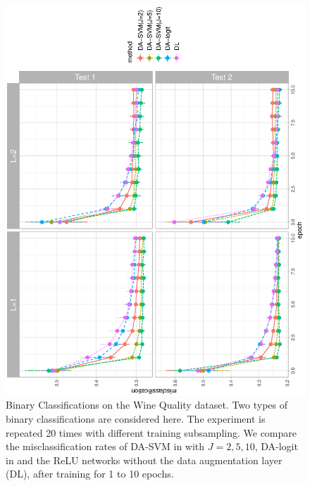 \documentclass[ba]{imsart}
\numberwithin{equation}{section}
\theoremstyle{plain}
\begin{document}
\begin{figure}[!ht]
\includegraphics[height=0.95\textwidth, angle=270]{fig/wine_quality_adam.eps}
\caption{Binary Classifications on the Wine Quality dataset. Two types of binary classifications are considered here. The experiment is repeated 20 times with different training subsampling. We compare the misclassification rates of DA-SVM in  with $J=2, 5, 10$, DA-logit in  and the ReLU networks without the data augmentation layer (DL), after training for 1 to 10 epochs.}\label{fig:wine}
\vspace{-0.1in}
\end{figure}
\end{document}

